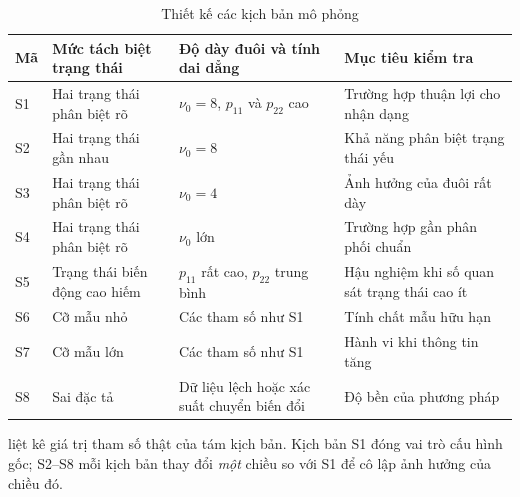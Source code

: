 \documentclass[12pt,a4paper]{article}
\numberwithin{equation}{section}
\begin{document}
\begin{table}[H]
\centering
\caption{Thiết kế các kịch bản mô phỏng}
\label{tab:simulation-scenarios}
\begin{tabularx}{\textwidth}{p{}Y Y Y}
\toprule
\textbf{Mã} & \textbf{Mức tách biệt trạng thái} & \textbf{Độ dày đuôi và tính dai dẳng} & \textbf{Mục tiêu kiểm tra} \\
\midrule
S1 & Hai trạng thái phân biệt rõ & $\nu_0=8$, $p_{11}$ và $p_{22}$ cao & Trường hợp thuận lợi cho nhận dạng \\
S2 & Hai trạng thái gần nhau & $\nu_0=8$ & Khả năng phân biệt trạng thái yếu \\
S3 & Hai trạng thái phân biệt rõ & $\nu_0=4$ & Ảnh hưởng của đuôi rất dày \\
S4 & Hai trạng thái phân biệt rõ & $\nu_0$ lớn & Trường hợp gần phân phối chuẩn \\
S5 & Trạng thái biến động cao hiếm & $p_{11}$ rất cao, $p_{22}$ trung bình & Hậu nghiệm khi số quan sát trạng thái cao ít \\
S6 & Cỡ mẫu nhỏ & Các tham số như S1 & Tính chất mẫu hữu hạn \\
S7 & Cỡ mẫu lớn & Các tham số như S1 & Hành vi khi thông tin tăng \\
S8 & Sai đặc tả & Dữ liệu lệch hoặc xác suất chuyển biến đổi & Độ bền của phương pháp \\
\bottomrule
\end{tabularx}
\end{table}

 liệt kê giá trị tham số thật của tám kịch bản. Kịch bản S1 đóng vai trò cấu hình gốc; S2--S8 mỗi kịch bản thay đổi \emph{một} chiều so với S1 để cô lập ảnh hưởng của chiều đó.
\end{document}
